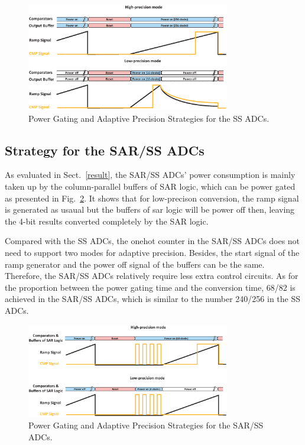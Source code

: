 \documentclass[conference]{IEEEtran}
\begin{document}
\begin{figure}[htbp]
	\centerline{\includegraphics[width=3.5in]{./Figures/SS_pg.eps}}
	\caption{Power Gating and Adaptive Precision Strategies for the SS ADCs.}
	\label{SS_pg}
\end{figure} 

\subsection{Strategy for the SAR/SS ADCs}
As evaluated in Sect.~\ref{result}, the SAR/SS ADCs’ power consumption is mainly taken up by the column-parallel buffers of SAR logic, which can be power gated as presented in Fig.~\ref{SAR_pg}. 
It shows that for low-precison conversion, the ramp signal is generated as usaual but the buffers of sar logic will be power off then, leaving the 4-bit results converted completely by the SAR logic. 

Compared with the SS ADCs, the onehot counter in the SAR/SS ADCs does not need to support two modes for adaptive precision. 
Besides, the start signal of the ramp generator and the power off signal of the buffers can be the same. Therefore, the SAR/SS ADCs relatively require less extra control circuits.
As for the proportion between the power gating time and the conversion time, 68/82 is achieved in the SAR/SS ADCs, which is similar to the number 240/256 in the SS ADCs.

\begin{figure}[htbp]
	\centerline{\includegraphics[width=3.5in]{./Figures/SAR_pg.eps}}
	\caption{Power Gating and Adaptive Precision Strategies for the SAR/SS ADCs.}
	\label{SAR_pg}
\end{figure} 
\end{document}
